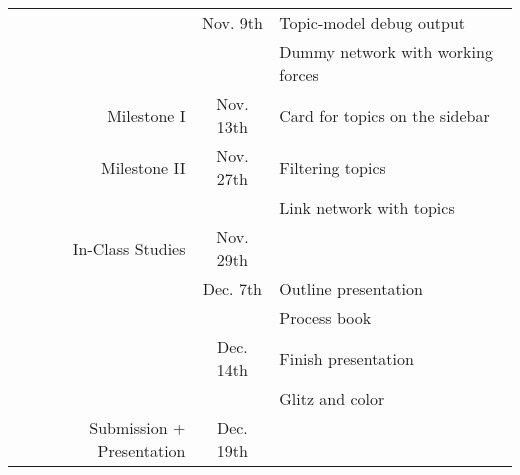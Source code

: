 \begin{tabular}{|r|c|l|}
	\hline
	                          &  Nov. 9th & Topic-model debug output \\
														&           & Dummy network with working forces\\\hline
	              Milestone I & Nov. 13th & Card for topics on the sidebar \\\hline
							 Milestone II & Nov. 27th & Filtering topics \\
														&           & Link network with topics \\\hline
					 In-Class Studies & Nov. 29th & \\\hline
	                          &  Dec. 7th & Outline presentation \\
														&           & Process book \\\hline
	                          & Dec. 14th & Finish presentation \\
														&           & Glitz and color \\\hline
	Submission + Presentation & Dec. 19th & \\\hline
\end{tabular}



